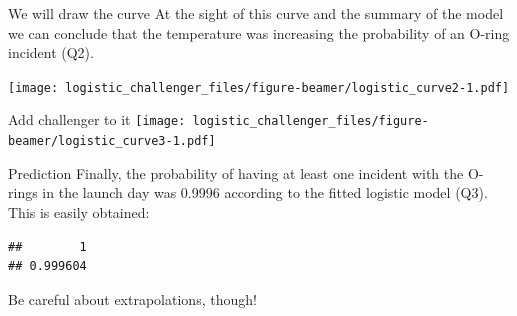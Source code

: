 \documentclass[
  ignorenonframetext,
]{beamer}
\begin{document}
\begin{frame}{We will draw the curve}
\protect\hypertarget{we-will-draw-the-curve-1}{}
At the sight of this curve and the summary of the model we can conclude
that the temperature was increasing the probability of an O-ring
incident (Q2).

\texttt{[image: logistic\_challenger\_files/figure-beamer/logistic\_curve2-1.pdf]}
\end{frame}

\begin{frame}{Add challenger to it}
\protect\hypertarget{add-challenger-to-it}{}
\texttt{[image: logistic\_challenger\_files/figure-beamer/logistic\_curve3-1.pdf]}
\end{frame}

\begin{frame}[fragile]{Prediction}
\protect\hypertarget{prediction}{}
Finally, the probability of having at least one incident with the
O-rings in the launch day was 0.9996 according to the fitted logistic
model (Q3). This is easily obtained:

\begin{verbatim}
##        1 
## 0.999604
\end{verbatim}

Be careful about extrapolations, though!
\end{frame}
\end{document}

